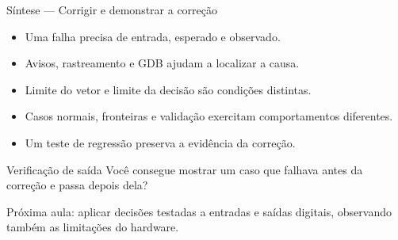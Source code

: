 \begin{frame}{Síntese — Corrigir e demonstrar a correção}
\begin{itemize}
\item Uma falha precisa de entrada, esperado e observado.
\item Avisos, rastreamento e GDB ajudam a localizar a causa.
\item Limite do vetor e limite da decisão são condições distintas.
\item Casos normais, fronteiras e validação exercitam comportamentos diferentes.
\item Um teste de regressão preserva a evidência da correção.
\end{itemize}
\begin{block}{Verificação de saída}
Você consegue mostrar um caso que falhava antes da correção e passa depois dela?
\end{block}
\small Próxima aula: aplicar decisões testadas a entradas e saídas digitais, observando também as limitações do hardware.
\end{frame}
